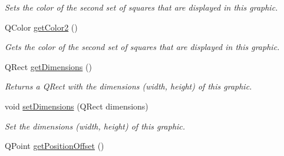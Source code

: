 \begin{DoxyCompactItemize}
\begin{DoxyCompactList}\small\item\em Sets the color of the second set of squares that are displayed in this graphic. \end{DoxyCompactList}\item 
\hypertarget{class_picto_1_1_randomly_filled_grid_graphic_a39737e2eb0c755f1c006f76df8314381}{Q\-Color \hyperlink{class_picto_1_1_randomly_filled_grid_graphic_a39737e2eb0c755f1c006f76df8314381}{get\-Color2} ()}\label{class_picto_1_1_randomly_filled_grid_graphic_a39737e2eb0c755f1c006f76df8314381}

\begin{DoxyCompactList}\small\item\em Gets the color of the second set of squares that are displayed in this graphic. \end{DoxyCompactList}\item 
Q\-Rect \hyperlink{class_picto_1_1_randomly_filled_grid_graphic_af2c1d9be95dcbe00c4c5aa8917bdbdb0}{get\-Dimensions} ()
\begin{DoxyCompactList}\small\item\em Returns a Q\-Rect with the dimensions (width, height) of this graphic. \end{DoxyCompactList}\item 
void \hyperlink{class_picto_1_1_randomly_filled_grid_graphic_a2d8c5afb5cd60cab80d5ef325f83f780}{set\-Dimensions} (Q\-Rect dimensions)
\begin{DoxyCompactList}\small\item\em Set the dimensions (width, height) of this graphic. \end{DoxyCompactList}\item 
\hypertarget{class_picto_1_1_randomly_filled_grid_graphic_ae78a7a82bc7c563f4ad8afb5c6e82076}{Q\-Point \hyperlink{class_picto_1_1_randomly_filled_grid_graphic_ae78a7a82bc7c563f4ad8afb5c6e82076}{get\-Position\-Offset} ()}\label{class_picto_1_1_randomly_filled_grid_graphic_ae78a7a82bc7c563f4ad8afb5c6e82076}


\end{DoxyCompactItemize}
